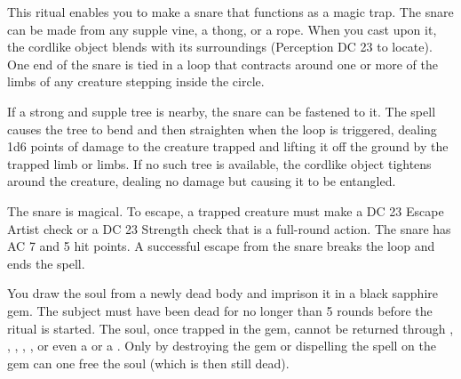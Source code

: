 \begin{spelleffect}
This ritual enables you to make a snare that functions as a magic trap. The snare can be made from any supple vine, a thong, or a rope. When you cast  upon it, the cordlike object blends with its surroundings (Perception DC 23 to locate). One end of the snare is tied in a loop that contracts around one or more of the limbs of any creature stepping inside the circle.
\par If a strong and supple tree is nearby, the snare can be fastened to it. The spell causes the tree to bend and then straighten when the loop is triggered, dealing 1d6 points of damage to the creature trapped and lifting it off the ground by the trapped limb or limbs. If no such tree is available, the cordlike object tightens around the creature, dealing no damage but causing it to be entangled.
\par The snare is magical. To escape, a trapped creature must make a DC 23 Escape Artist check or a DC 23 Strength check that is a full-round action. The snare has AC 7 and 5 hit points. A successful escape from the snare breaks the loop and ends the spell.
\end{spelleffect}

\spellrng{\rngclose}
\begin{spelleffect}
You draw the soul from a newly dead body and imprison it in a black sapphire gem. The subject must have been dead for no longer than 5 rounds before the ritual is started. The soul, once trapped in the gem, cannot be returned through , , , , , or even a  or a . Only by destroying the gem or dispelling the spell on the gem can one free the soul (which is then still dead).
\end{spelleffect}

